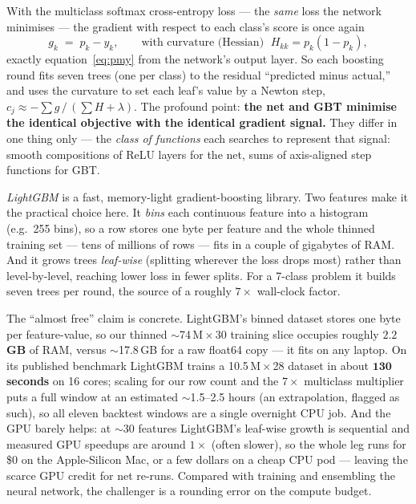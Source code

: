 \documentclass[11pt]{article}
\begin{document}
\begin{derivation}
With the multiclass softmax cross-entropy loss --- the \emph{same} loss the network minimises ---
the gradient with respect to each class's score is once again
\[
  g_k \;=\; p_k - y_k,
  \qquad\text{with curvature (Hessian) } \; H_{kk} = p_k(1-p_k),
\]
exactly equation~\eqref{eq:pmy} from the network's output layer. So each boosting round fits
seven trees (one per class) to the residual ``predicted minus actual,'' and uses the curvature
to set each leaf's value by a Newton step, $c_j \approx -\sum g \,/\,(\sum H + \lambda)$. The
profound point: \textbf{the net and GBT minimise the identical objective with the identical
gradient signal.} They differ in one thing only --- the \emph{class of functions} each searches
to represent that signal: smooth compositions of ReLU layers for the net, sums of axis-aligned
step functions for GBT.
\end{derivation}

\begin{jargon}
\emph{LightGBM} is a fast, memory-light gradient-boosting library. Two features make it the
practical choice here. It \emph{bins} each continuous feature into a histogram (e.g.\ 255 bins),
so a row stores one byte per feature and the whole thinned training set --- tens of millions of
rows --- fits in a couple of gigabytes of RAM. And it grows trees \emph{leaf-wise} (splitting
wherever the loss drops most) rather than level-by-level, reaching lower loss in fewer splits.
For a 7-class problem it builds seven trees per round, the source of a roughly $7\times$
wall-clock factor.
\end{jargon}

\begin{intuition}
The ``almost free'' claim is concrete. LightGBM's binned dataset stores one byte per
feature-value, so our thinned $\sim$74\,M\,$\times\,$30 training slice occupies roughly
$\mathbf{2.2}$\,\textbf{GB} of RAM, versus $\sim$17.8\,GB for a raw float64 copy --- it fits on
any laptop. On its published benchmark LightGBM trains a 10.5\,M\,$\times$\,28 dataset in about
$\mathbf{130}$\,\textbf{seconds} on 16 cores; scaling for our row count and the $7\times$
multiclass multiplier puts a full window at an estimated $\sim$1.5--2.5 hours (an
extrapolation, flagged as such), so all eleven backtest windows are a single overnight CPU job.
And the GPU barely helps: at $\sim$30 features LightGBM's leaf-wise growth is sequential and
measured GPU speedups are around $1\times$ (often slower), so the whole leg runs for \$0 on the
Apple-Silicon Mac, or a few dollars on a cheap CPU pod --- leaving the scarce GPU credit for net
re-runs. Compared with training and ensembling the neural network, the challenger is a rounding
error on the compute budget.
\end{intuition}
\end{document}
